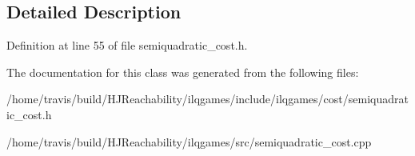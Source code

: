 \subsection{Detailed Description}


Definition at line 55 of file semiquadratic\+\_\+cost.\+h.



The documentation for this class was generated from the following files\+:\begin{DoxyCompactItemize}
\item 
/home/travis/build/\+H\+J\+Reachability/ilqgames/include/ilqgames/cost/semiquadratic\+\_\+cost.\+h\item 
/home/travis/build/\+H\+J\+Reachability/ilqgames/src/semiquadratic\+\_\+cost.\+cpp\end{DoxyCompactItemize}
